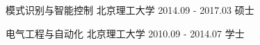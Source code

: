 


\begin{ljyedus}


\ljyedu
{模式识别与智能控制} %
{北京理工大学} %
{2014.09 - 2017.03} %
{硕士} %
    

\ljyedu
{电气工程与自动化}  %
{北京理工大学}%
{2010.09 - 2014.07} %
{学士} %


\end{ljyedus}